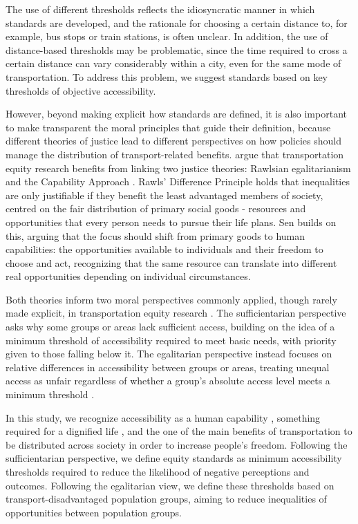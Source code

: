 \documentclass[preprint, 3p,
authoryear]{elsarticle} %
\begin{document}
The use of different thresholds reflects the idiosyncratic manner in
which standards are developed, and the rationale for choosing a certain
distance to, for example, bus stops or train stations, is often unclear.
In addition, the use of distance-based thresholds may be problematic,
since the time required to cross a certain distance can vary
considerably within a city, even for the same mode of transportation. To
address this problem, we suggest standards based on key thresholds of
objective accessibility.

However, beyond making explicit how standards are defined, it is also
important to make transparent the moral principles that guide their
definition, because different theories of justice lead to different
perspectives on how policies should manage the distribution of
transport-related benefits. \citet{pereira2021} argue that
transportation equity research benefits from linking two justice
theories: Rawlsian egalitarianism \citep{rawls1999} and the Capability
Approach \citep{sen1979, sen1999, sen2005, sen2009}. Rawls' Difference
Principle holds that inequalities are only justifiable if they benefit
the least advantaged members of society, centred on the fair
distribution of primary social goods - resources and opportunities that
every person needs to pursue their life plans. Sen builds on this,
arguing that the focus should shift from primary goods to human
capabilities: the opportunities available to individuals and their
freedom to choose and act, recognizing that the same resource can
translate into different real opportunities depending on individual
circumstances.

Both theories inform two moral perspectives commonly applied, though
rarely made explicit, in transportation equity research
\citep{martens2016a, wee2011}. The sufficientarian perspective asks why
some groups or areas lack sufficient access, building on the idea of a
minimum threshold of accessibility required to meet basic needs, with
priority given to those falling below it. The egalitarian perspective
instead focuses on relative differences in accessibility between groups
or areas, treating unequal access as unfair regardless of whether a
group's absolute access level meets a minimum threshold
\citep{pereira2021}.

In this study, we recognize accessibility as a human capability
\citep{sen2005, sen1999, pereira2017, luz2022}, something required for a
dignified life \citep{karner2020, dossantos}, and the one of the main
benefits of transportation to be distributed across society in order to
increase people's freedom. Following the sufficientarian perspective, we
define equity standards as minimum accessibility thresholds required to
reduce the likelihood of negative perceptions and outcomes. Following
the egalitarian view, we define these thresholds based on
transport-disadvantaged population groups, aiming to reduce inequalities
of opportunities between population groups.
\end{document}
